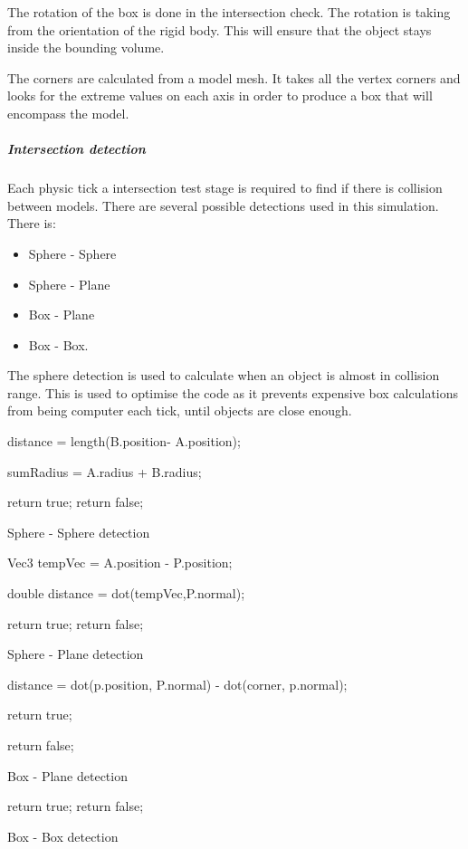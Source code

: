 \documentclass[conference,backref=page]{acmsiggraph}
\begin{document}
The rotation of the box is done in the intersection check. The rotation is taking from the orientation of the rigid body. This will ensure that the object stays inside the bounding volume.

The corners are calculated from a model mesh. It takes all the vertex corners and looks for the extreme values on each axis in order to produce a box that will encompass the model.

\subparagraph{Intersection detection} \hfill

Each physic tick a intersection test stage is required to find if there is collision between models. 
There are several possible detections used in this simulation. There is:
\begin{itemize}
	\item Sphere - Sphere
	\item Sphere - Plane
	\item Box - Plane
	\item Box - Box.
\end{itemize}

The sphere detection is used to calculate when an object is almost in collision range. This is used to optimise the code as it prevents expensive box calculations from being computer each tick, until objects are close enough.

\begin{algorithm}
	distance = length(B.position- A.position); \hfill
	
	sumRadius = A.radius + B.radius;\hfill
	
	{	
		return true;
	}
	return false;
	\caption{Sphere - Sphere detection}
\end{algorithm}

\begin{algorithm}
	Vec3 tempVec = A.position - P.position; \hfill
	
	double distance = dot(tempVec,P.normal); \hfill
	
	{
		return true;
	}
	return false;
	\caption{Sphere - Plane detection}
\end{algorithm}
\begin{algorithm}
	{
		distance = dot(p.position, P.normal) - dot(corner, p.normal);\hfill
		
		{
			return true;
		}
	}
	return false;
		
	\caption{Box - Plane detection}
\end{algorithm}
\begin{algorithm}
	{
		{
			{
				{
					return true;	
				}	
			}
		}
	}
	return false;	
	\caption{Box - Box detection}
\end{algorithm}
\end{document}
